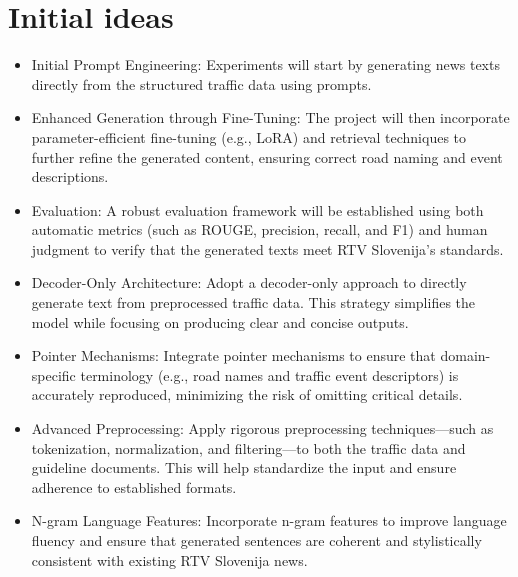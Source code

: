 \documentclass[fleqn,moreauthors,10pt]{ds_report}
\begin{document}
\section{Initial ideas}
\begin{itemize}
    \item Initial Prompt Engineering: Experiments will start by generating news texts directly from the structured traffic data using prompts.
    \item Enhanced Generation through Fine-Tuning: The project will then incorporate parameter-efficient fine-tuning (e.g., LoRA) and retrieval techniques to further refine the generated content, ensuring correct road naming and event descriptions.
    
    \item Evaluation: A robust evaluation framework will be established using both automatic metrics (such as ROUGE, precision, recall, and F1) and human judgment to verify that the generated texts meet RTV Slovenija’s standards.
    
    \item Decoder-Only Architecture: Adopt a decoder-only approach to directly generate text from preprocessed traffic data. This strategy simplifies the model while focusing on producing clear and concise outputs.

    \item Pointer Mechanisms: Integrate pointer mechanisms to ensure that domain-specific terminology (e.g., road names and traffic event descriptors) is accurately reproduced, minimizing the risk of omitting critical details.

    \item Advanced Preprocessing: Apply rigorous preprocessing techniques—such as tokenization, normalization, and filtering—to both the traffic data and guideline documents. This will help standardize the input and ensure adherence to established formats.

    \item N-gram Language Features: Incorporate n-gram features to improve language fluency and ensure that generated sentences are coherent and stylistically consistent with existing RTV Slovenija news.


\end{itemize}




\end{document}
